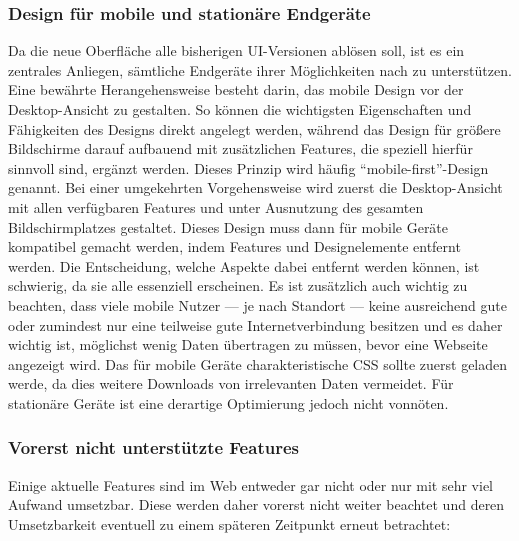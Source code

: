 \subsubsection{Design für mobile und stationäre Endgeräte}
Da die neue Oberfläche alle bisherigen UI-Versionen ablösen soll, ist es ein zentrales Anliegen, sämtliche Endgeräte ihrer Möglichkeiten nach zu unterstützen. Eine bewährte Herangehensweise besteht darin, das mobile Design vor der Desktop-Ansicht zu gestalten. So können die wichtigsten Eigenschaften und Fähigkeiten des Designs direkt angelegt werden, während das Design für größere Bildschirme darauf aufbauend mit zusätzlichen Features, die speziell hierfür sinnvoll sind, ergänzt werden. Dieses Prinzip wird häufig ``mobile-first''-Design genannt. Bei einer umgekehrten Vorgehensweise wird zuerst die Desktop-Ansicht mit allen verfügbaren Features und unter Ausnutzung des gesamten Bildschirmplatzes gestaltet. Dieses Design muss dann für mobile Geräte kompatibel gemacht werden, indem Features und Designelemente entfernt werden. Die Entscheidung, welche Aspekte dabei entfernt werden können, ist schwierig, da sie alle essenziell erscheinen.
Es ist zusätzlich auch wichtig zu beachten, dass viele mobile Nutzer --- je nach Standort --- keine ausreichend gute oder zumindest nur eine teilweise gute Internetverbindung besitzen und es daher wichtig ist, möglichst wenig Daten übertragen zu müssen, bevor eine Webseite angezeigt wird. Das für mobile Geräte charakteristische CSS sollte zuerst geladen werde, da dies weitere Downloads von irrelevanten Daten vermeidet. Für stationäre Geräte ist eine derartige Optimierung jedoch nicht vonnöten.

\subsubsection{Vorerst nicht unterstützte Features}
Einige aktuelle Features sind im Web entweder gar nicht oder nur mit sehr viel Aufwand umsetzbar. Diese werden daher vorerst nicht weiter beachtet und deren Umsetzbarkeit eventuell zu einem späteren Zeitpunkt erneut betrachtet:

